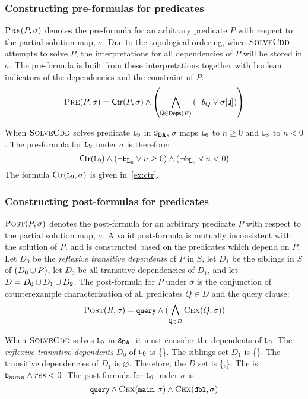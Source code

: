 \subsubsection{Constructing pre-formulas for predicates}
\label{sec:cons-pre}
%
$\textsc{Pre}(P, \sigma)$ denotes the pre-formula for an arbitrary predicate $P$
with respect to the partial solution map, $\sigma$.
%
Due to the topological ordering, when $\textsc{SolveCdd}$ attempts to solve $P$, the
interpretations for all dependencies of $P$ will be stored in
$\sigma$.
%
The pre-formula is built from these interpretations together with boolean
indicators of the dependencies and the constraint of $P$:
%
\[
\prectr(P,\sigma) =
  \ctrof{P,\sigma} \land
    \left(
      \bigland_{\cc{Q} \in \depsof{P}}
      \left(\neg b_Q \lor \sigma[ \cc{Q} ]  \right)
    \right)
\]
%
\begin{ex}
  \label{ex:pre-ctr}
  When $\textsc{SolveCdd}$ solves predicate $\cc{L}_9$ in $\mcchc$,
  $\sigma$ maps $\cc{L}_6$ to $n \ge 0$ and $\cc{L}_8$ to $n < 0$.
  The pre-formula for $\cc{L}_9$ under $\sigma$ is therefore:
  $$\ctrof{\cc{L}_9}
  \land (\neg \cc{b}_{\cc{L}_6} \lor n \ge 0) \land (\neg \cc{b}_{\cc{L}_8}
  \lor n < 0)$$
  The formula $\ctrof{\cc{L}_9,\sigma}$ is given in~\autoref{ex:ctr}.
\end{ex}

\subsubsection{Constructing post-formulas for predicates}
\label{sec:cons-post}
$\textsc{Post}(P, \sigma)$ denotes the post-formula for an arbitrary predicate $P$
with respect to the partial solution map, $\sigma$. A valid
post-formula is mutually inconsistent with the solution of $P$.
%
and is constructed based on the predicates which depend on $P$.
%
Let $D_0$ be the \emph{reflexive transitive dependents} of $P$ in $S$,
let $D_1$ be the siblings in $S$ of $(D_0 \cup {P})$,
%
let $D_2$ be all transitive dependencies of $D_1$, and
let $D = D_0 \cup D_1 \cup D_2$.
The post-formula for $P$ under $\sigma$ is the conjunction of counterexample
characterization of all predicates $Q \in D$ and the query clause:
%
\[
\postctr(R, \sigma) =\cc{query} \land (\bigland_{\cc{Q} \in D} \vc{Q,\sigma})
\]
\begin{ex}
  \label{ex:ctx-ctr}
  When $\textsc{SolveCdd}$ solves $\cc{L}_9$ in $\mcchc$, it must consider
  the dependents of $\cc{L}_9$.
  The \emph{reflexive transitive dependents} $D_0$ of $\cc{L}_9$ is \{\}.
  The siblings set $D_1$ is \{\}.
  The transitive dependencies of $D_1$ is $\varnothing$. 
  Therefore, the $D$ set is \{,\}.
  The  is $\cc{b}_{main} \land res<0$.
  The post-formula for $\cc{L}_9$ under $\sigma$ is:
  $$\cc{query} \land \vc{\cc{main},\sigma} \land \vc{\cc{dbl},\sigma}$$
\end{ex}

